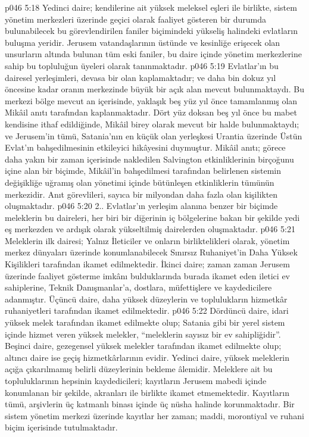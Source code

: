 \vs p046 5:18 Yedinci daire; kendilerine ait yüksek meleksel eşleri ile birlikte, sistem yönetim merkezleri üzerinde geçici olarak faaliyet gösteren bir durumda bulunabilecek bu görevlendirilen faniler biçimindeki yükseliş halindeki evlatların buluşma yeridir. Jerusem vatandaşlarının üstünde ve kesinliğe erişecek olan unsurların altında bulunan tüm eski faniler, bu daire içinde yönetim merkezlerine sahip bu topluluğun üyeleri olarak tanınmaktadır.
\vs p046 5:19 Evlatlar’ın bu dairesel yerleşimleri, devasa bir olan kaplamaktadır; ve daha bin dokuz yıl öncesine kadar oranın merkezinde büyük bir açık alan mevcut bulunmaktaydı. Bu merkezi bölge mevcut an içerisinde, yaklaşık beş yüz yıl önce tamamlanmış olan Mikâil anıtı tarafından kaplanmaktadır. Dört yüz doksan beş yıl önce bu mabet kendisine ithaf edildiğinde, Mikâil birey olarak mevcut bir halde bulunmaktaydı; ve Jerusem’in tümü, Satania’nın en küçük olan yerleşkesi Urantia üzerinde Üstün Evlat’ın bahşedilmesinin etkileyici hikâyesini duymuştur. Mikâil anıtı; görece daha yakın bir zaman içerisinde nakledilen Salvington etkinliklerinin birçoğunu içine alan bir biçimde, Mikâil’in bahşedilmesi tarafından belirlenen sistemin değişikliğe uğramış olan yönetimi içinde bütünleşen etkinliklerin tümünün merkezidir. Anıt görevlileri, sayıca bir milyondan daha fazla olan kişilikten oluşmaktadır.
\vs p046 5:20 2.. Evlatlar’ın yerleşim alanına benzer bir biçimde meleklerin bu daireleri, her biri bir diğerinin iç bölgelerine bakan bir şekilde yedi eş merkezden ve ardışık olarak yükseltilmiş dairelerden oluşmaktadır.
\vs p046 5:21 Meleklerin ilk dairesi; Yalnız İleticiler ve onların birliktelikleri olarak, yönetim merkez dünyaları üzerinde konumlanabilecek Sınırsız Ruhaniyet’in Daha Yüksek Kişilikleri tarafından ikamet edilmektedir. İkinci daire; zaman zaman Jerusem üzerinde faaliyet gösterme imkânı bulduklarında burada ikamet eden iletici ev sahiplerine, Teknik Danışmanlar’a, dostlara, müfettişlere ve kaydedicilere adanmıştır. Üçüncü daire, daha yüksek düzeylerin ve toplulukların hizmetkâr ruhaniyetleri tarafından ikamet edilmektedir.
\vs p046 5:22 Dördüncü daire, idari yüksek melek tarafından ikamet edilmekte olup; Satania gibi bir yerel sistem içinde hizmet veren yüksek melekler, “meleklerin sayısız bir ev sahipliğidir”. Beşinci daire, gezegensel yüksek melekler tarafından ikamet edilmekte olup; altıncı daire ise geçiş hizmetkârlarının evidir. Yedinci daire, yüksek meleklerin açığa çıkarılmamış belirli düzeylerinin bekleme âlemidir. Meleklere ait bu topluluklarının hepsinin kaydedicileri; kayıtların Jerusem mabedi içinde konumlanan bir şekilde, akranları ile birlikte ikamet etmemektedir. Kayıtların tümü, arşivlerin üç katmanlı binası içinde üç nüsha halinde korunmaktadır. Bir sistem yönetim merkezi üzerinde kayıtlar her zaman; maddi, morontiyal ve ruhani biçim içerisinde tutulmaktadır.
